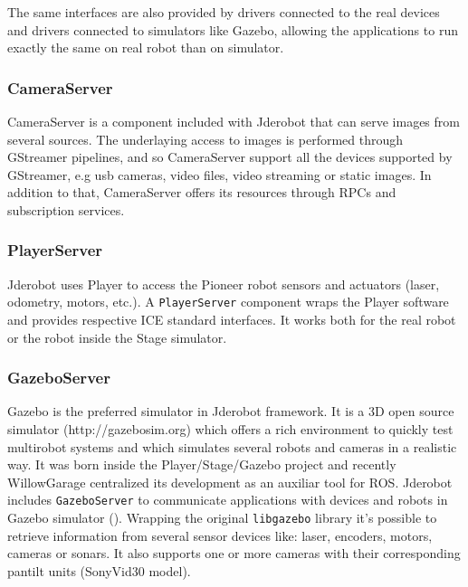 \documentclass[twocolumn]{svjour3}          %
\begin{document}
The same interfaces are also provided by drivers connected to the real devices and drivers connected to simulators like Gazebo, allowing the applications to run exactly the same on real robot than on simulator. 


\subsubsection{CameraServer}
CameraServer is a component included with Jderobot that can serve images from several sources. The underlaying access to images is performed through GStreamer pipelines, and so CameraServer support all the devices supported by GStreamer, e.g  usb cameras, video files, video streaming or static images. In addition to that, CameraServer offers its resources through RPCs and subscription services.

\subsubsection{PlayerServer}

Jderobot uses Player to access the Pioneer robot sensors and actuators (laser, odometry, motors, etc.). A \texttt{PlayerServer} component wraps the Player software and provides respective ICE standard interfaces. It works both for the real robot or the robot inside the Stage simulator.

\subsubsection{GazeboServer}
\label{subsec:gazeboserver}

Gazebo is the preferred simulator in Jderobot framework. It is a 3D open source simulator (http://gazebosim.org) which offers a rich environment to quickly test multirobot systems and which simulates several robots and cameras in a realistic way. It was born inside the Player/Stage/Gazebo project and recently WillowGarage centralized its development as an auxiliar tool for ROS. Jderobot includes \texttt{GazeboServer} to communicate applications with devices and robots in Gazebo simulator (\cite{koening2004}). Wrapping the original \texttt{libgazebo} library it's possible to retrieve information from several sensor devices like: laser, encoders, motors, cameras or sonars. It also supports one or more cameras with their corresponding pantilt units (SonyVid30 model).
\end{document}
